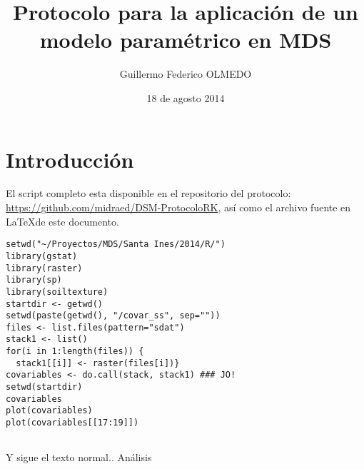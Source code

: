 \documentclass[10pt,a4paper]{article}
\date{18 de agosto 2014}
\title{Protocolo para la aplicación de un modelo paramétrico en MDS}
\author{Guillermo Federico OLMEDO}
\begin{document}
\maketitle
\section{Introducción}
El script completo esta disponible en el repositorio del protocolo: 
\url{https://github.com/midraed/DSM-ProtocoloRK}, así como el archivo fuente en \LaTeX\space de este documento.
\begin{lstlisting}
setwd("~/Proyectos/MDS/Santa Ines/2014/R/")
library(gstat)
library(raster)
library(sp)
library(soiltexture)
startdir <- getwd()
setwd(paste(getwd(), "/covar_ss", sep=""))
files <- list.files(pattern="sdat")
stack1 <- list()
for(i in 1:length(files)) {
  stack1[[i]] <- raster(files[i])}
covariables <- do.call(stack, stack1) ### JO!
setwd(startdir)
covariables
plot(covariables)
plot(covariables[[17:19]])


\end{lstlisting}
Y sigue el texto normal..\citep*{webster_geostatistics_2007} Análisis
\end{document}
